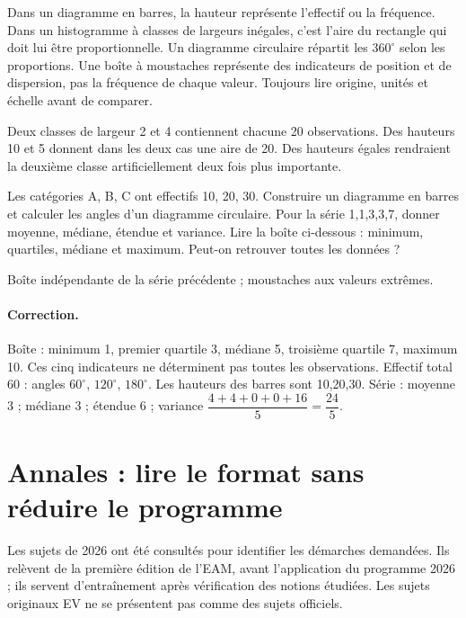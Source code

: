 Dans un diagramme en barres, la hauteur représente l’effectif ou la fréquence. Dans un histogramme à classes de largeurs inégales, c’est l’aire du rectangle qui doit lui être proportionnelle. Un diagramme circulaire répartit les $360^\circ$ selon les proportions. Une boîte à moustaches représente des indicateurs de position et de dispersion, pas la fréquence de chaque valeur. Toujours lire origine, unités et échelle avant de comparer.
\begin{example}Deux classes de largeur 2 et 4 contiennent chacune 20 observations. Des hauteurs 10 et 5 donnent dans les deux cas une aire de 20. Des hauteurs égales rendraient la deuxième classe artificiellement deux fois plus importante.\end{example}
\begin{application}Les catégories A, B, C ont effectifs 10, 20, 30. Construire un diagramme en barres et calculer les angles d’un diagramme circulaire. Pour la série 1,1,3,3,7, donner moyenne, médiane, étendue et variance. Lire la boîte ci-dessous : minimum, quartiles, médiane et maximum. Peut-on retrouver toutes les données ?\end{application}\label{STATS-EX}
\begin{center}\par\small Boîte indépendante de la série précédente ; moustaches aux valeurs extrêmes.\end{center}
\ifmxteacher
\paragraph{Correction.} Boîte : minimum 1, premier quartile 3, médiane 5, troisième quartile 7, maximum 10. Ces cinq indicateurs ne déterminent pas toutes les observations. Effectif total 60 : angles $60^\circ$, $120^\circ$, $180^\circ$. Les hauteurs des barres sont 10,20,30. Série : moyenne 3 ; médiane 3 ; étendue 6 ; variance $\dfrac{4+4+0+0+16}{5}=\dfrac{24}{5}$.
\fi

\section{Annales : lire le format sans réduire le programme}\label{ANNALES}
Les sujets de 2026 ont été consultés pour identifier les démarches demandées. Ils relèvent de la première édition de l’EAM, avant l’application du programme 2026 ; ils servent d’entraînement après vérification des notions étudiées. Les sujets originaux EV ne se présentent pas comme des sujets officiels.

